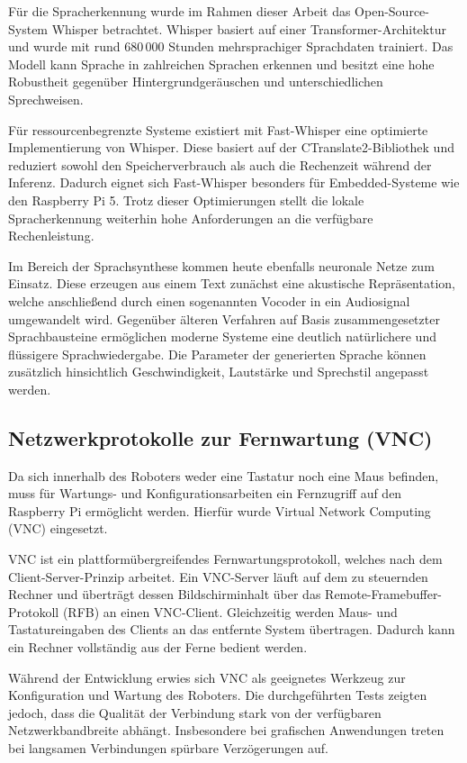 Für die Spracherkennung wurde im Rahmen dieser Arbeit das Open-Source-System Whisper betrachtet. Whisper basiert auf einer Transformer-Architektur und wurde mit rund 680\,000 Stunden mehrsprachiger Sprachdaten trainiert. Das Modell kann Sprache in zahlreichen Sprachen erkennen und besitzt eine hohe Robustheit gegenüber Hintergrundgeräuschen und unterschiedlichen Sprechweisen. \cite{radford2022whisper}

Für ressourcenbegrenzte Systeme existiert mit Fast-Whisper eine optimierte Implementierung von Whisper. Diese basiert auf der CTranslate2-Bibliothek und reduziert sowohl den Speicherverbrauch als auch die Rechenzeit während der Inferenz. Dadurch eignet sich Fast-Whisper besonders für Embedded-Systeme wie den Raspberry Pi 5. Trotz dieser Optimierungen stellt die lokale Spracherkennung weiterhin hohe Anforderungen an die verfügbare Rechenleistung. \cite{systran2024fasterwhisper}

Im Bereich der Sprachsynthese kommen heute ebenfalls neuronale Netze zum Einsatz. Diese erzeugen aus einem Text zunächst eine akustische Repräsentation, welche anschließend durch einen sogenannten Vocoder in ein Audiosignal umgewandelt wird. Gegenüber älteren Verfahren auf Basis zusammengesetzter Sprachbausteine ermöglichen moderne Systeme eine deutlich natürlichere und flüssigere Sprachwiedergabe. Die Parameter der generierten Sprache können zusätzlich hinsichtlich Geschwindigkeit, Lautstärke und Sprechstil angepasst werden. \cite{shen2018tacotron}


\subsection{Netzwerkprotokolle zur Fernwartung (VNC)}

Da sich innerhalb des Roboters weder eine Tastatur noch eine Maus befinden, muss für Wartungs- und Konfigurationsarbeiten ein Fernzugriff auf den Raspberry Pi ermöglicht werden. Hierfür wurde Virtual Network Computing (VNC) eingesetzt. \cite{rfc6143}

VNC ist ein plattformübergreifendes Fernwartungsprotokoll, welches nach dem Client-Server-Prinzip arbeitet. Ein VNC-Server läuft auf dem zu steuernden Rechner und überträgt dessen Bildschirminhalt über das Remote-Framebuffer-Protokoll (RFB) an einen VNC-Client. Gleichzeitig werden Maus- und Tastatureingaben des Clients an das entfernte System übertragen. Dadurch kann ein Rechner vollständig aus der Ferne bedient werden. \cite{rfc6143}

Während der Entwicklung erwies sich VNC als geeignetes Werkzeug zur Konfiguration und Wartung des Roboters. Die durchgeführten Tests zeigten jedoch, dass die Qualität der Verbindung stark von der verfügbaren Netzwerkbandbreite abhängt. Insbesondere bei grafischen Anwendungen treten bei langsamen Verbindungen spürbare Verzögerungen auf.


